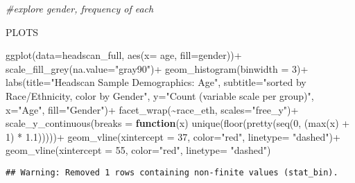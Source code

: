 \documentclass[
]{article}
\newenvironment{Shaded}{\begin{snugshade}}{\end{snugshade}}
\newcommand{\AttributeTok}[1]{\textcolor[rgb]{0.77,0.63,0.00}{#1}}
\newcommand{\CommentTok}[1]{\textcolor[rgb]{0.56,0.35,0.01}{\textit{#1}}}
\newcommand{\ControlFlowTok}[1]{\textcolor[rgb]{0.13,0.29,0.53}{\textbf{#1}}}
\newcommand{\DecValTok}[1]{\textcolor[rgb]{0.00,0.00,0.81}{#1}}
\newcommand{\FloatTok}[1]{\textcolor[rgb]{0.00,0.00,0.81}{#1}}
\newcommand{\FunctionTok}[1]{\textcolor[rgb]{0.00,0.00,0.00}{#1}}
\newcommand{\NormalTok}[1]{#1}
\newcommand{\SpecialCharTok}[1]{\textcolor[rgb]{0.00,0.00,0.00}{#1}}
\newcommand{\StringTok}[1]{\textcolor[rgb]{0.31,0.60,0.02}{#1}}
\begin{document}
\begin{Shaded}
\begin{Highlighting}[]
\CommentTok{\#explore gender, frequency of each}
\end{Highlighting}
\end{Shaded}

PLOTS

\begin{Shaded}
\begin{Highlighting}[]
\FunctionTok{ggplot}\NormalTok{(}\AttributeTok{data=}\NormalTok{headscan\_full, }\FunctionTok{aes}\NormalTok{(}\AttributeTok{x=}\NormalTok{ age, }\AttributeTok{fill=}\NormalTok{gender))}\SpecialCharTok{+}
  \FunctionTok{scale\_fill\_grey}\NormalTok{(}\AttributeTok{na.value=}\StringTok{"gray90"}\NormalTok{)}\SpecialCharTok{+}
  \FunctionTok{geom\_histogram}\NormalTok{(}\AttributeTok{binwidth =} \DecValTok{3}\NormalTok{)}\SpecialCharTok{+}
  \FunctionTok{labs}\NormalTok{(}\AttributeTok{title=}\StringTok{"Headscan Sample Demographics: Age"}\NormalTok{,}
       \AttributeTok{subtitle=}\StringTok{"sorted by Race/Ethnicity, color by Gender"}\NormalTok{,}
       \AttributeTok{y=}\StringTok{"Count (variable scale per group)"}\NormalTok{,}
       \AttributeTok{x=}\StringTok{"Age"}\NormalTok{,}
       \AttributeTok{fill=}\StringTok{"Gender"}\NormalTok{)}\SpecialCharTok{+}
  \FunctionTok{facet\_wrap}\NormalTok{(}\SpecialCharTok{\textasciitilde{}}\NormalTok{race\_eth, }\AttributeTok{scales=}\StringTok{"free\_y"}\NormalTok{)}\SpecialCharTok{+}
  \FunctionTok{scale\_y\_continuous}\NormalTok{(}\AttributeTok{breaks =} \ControlFlowTok{function}\NormalTok{(x) }\FunctionTok{unique}\NormalTok{(}\FunctionTok{floor}\NormalTok{(}\FunctionTok{pretty}\NormalTok{(}\FunctionTok{seq}\NormalTok{(}\DecValTok{0}\NormalTok{, (}\FunctionTok{max}\NormalTok{(x) }\SpecialCharTok{+} \DecValTok{1}\NormalTok{) }\SpecialCharTok{*} \FloatTok{1.1}\NormalTok{)))))}\SpecialCharTok{+}
  \FunctionTok{geom\_vline}\NormalTok{(}\AttributeTok{xintercept =} \DecValTok{37}\NormalTok{, }\AttributeTok{color=}\StringTok{"red"}\NormalTok{, }\AttributeTok{linetype=} \StringTok{"dashed"}\NormalTok{)}\SpecialCharTok{+}
  \FunctionTok{geom\_vline}\NormalTok{(}\AttributeTok{xintercept =} \DecValTok{55}\NormalTok{, }\AttributeTok{color=}\StringTok{"red"}\NormalTok{, }\AttributeTok{linetype=} \StringTok{"dashed"}\NormalTok{)}
\end{Highlighting}
\end{Shaded}

\begin{verbatim}
## Warning: Removed 1 rows containing non-finite values (stat_bin).
\end{verbatim}
\end{document}
